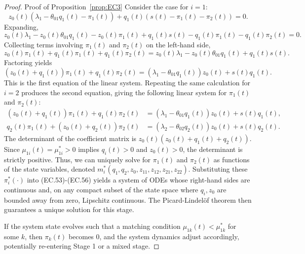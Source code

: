 \begin{proof}{Proof of Proposition~\ref{prop:EC3}}
Consider the case for $i=1$:
\begin{equation*}
  z_0(t)\left( \lambda_1 - \theta_{01}q_1(t) - \pi_1(t) \right) + q_1(t)\left( s(t) - \pi_1(t) - \pi_2(t) \right) = 0.
\end{equation*}
Expanding,
\begin{equation*}
  z_0(t)\lambda_1 - z_0(t)\theta_{01}q_1(t) - z_0(t)\pi_1(t) + q_1(t)s(t) - q_1(t)\pi_1(t) - q_1(t)\pi_2(t) = 0.
\end{equation*}
Collecting terms involving $\pi_1(t)$ and $\pi_2(t)$ on the left-hand side,
\begin{equation*}
  z_0(t)\pi_1(t) + q_1(t)\pi_1(t) + q_1(t)\pi_2(t) = z_0(t)\lambda_1 - z_0(t)\theta_{01}q_1(t) + q_1(t)s(t).
\end{equation*}
Factoring yields
\begin{equation*}
  (z_0(t) + q_1(t))\pi_1(t) + q_1(t)\pi_2(t) = (\lambda_1 - \theta_{01}q_1(t))z_0(t) + s(t)q_1(t).
\end{equation*}
This is the first equation of the linear system.
Repeating the same calculation for $i=2$ produces the second equation, giving the following linear system for $\pi_1(t)$ and $\pi_2(t)$:
\begin{align*}
(z_0(t) + q_1(t))\pi_1(t) + q_1(t)\pi_2(t) &= (\lambda_1 - \theta_{01}q_1(t))z_0(t) + s(t)q_1(t), \\
q_2(t)\pi_1(t) + (z_0(t) + q_2(t))\pi_2(t) &= (\lambda_2 - \theta_{02}q_2(t))z_0(t) + s(t)q_2(t).
\end{align*}
The determinant of the coefficient matrix is $z_0(t)(z_0(t) + q_1(t) + q_2(t))$.
Since $\mu_{1i}(t) = \mu_{1i}^* > 0$ implies $q_i(t) > 0$ and $z_0(t) > 0$, the determinant is strictly positive.
Thus, we can uniquely solve for $\pi_1(t)$ and $\pi_2(t)$ as functions of the state variables, denoted $m_i^*(q_1, q_2, z_0, z_{11}, z_{12}, z_{21}, z_{22})$.
Substituting these $\pi_i^*(\cdot)$ into (EC.53)-(EC.56) yields a system of ODEs whose right-hand sides are continuous and, on any compact subset of the state space where $q_i, z_0$ are bounded away from zero, Lipschitz continuous.
The Picard-Lindelöf theorem then guarantees a unique solution for this stage.

If the system state evolves such that a matching condition $\mu_{1k}(t) < \mu_{1k}^*$ for some $k$, then $\pi_k(t)$ becomes 0, and the system dynamics adjust accordingly, potentially re-entering Stage 1 or a mixed stage.


\end{proof}
